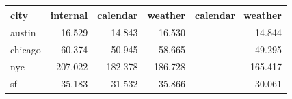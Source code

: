 \begin{tabular}{lrrrr}
\toprule
city & internal & calendar & weather & calendar\_weather \\
\midrule
austin & 16.529 & 14.843 & 16.530 & 14.844 \\
chicago & 60.374 & 50.945 & 58.665 & 49.295 \\
nyc & 207.022 & 182.378 & 186.728 & 165.417 \\
sf & 35.183 & 31.532 & 35.866 & 30.061 \\
\bottomrule
\end{tabular}
